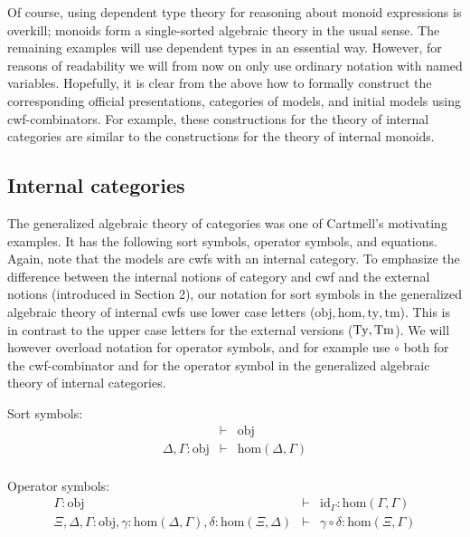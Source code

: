 \documentclass{mscs}
\newcommand{\FYI}[1]{{#1}}
\def\Obj{\mathrm{obj}}
\def\Hom{\mathrm{hom}}
\def\id{\mathrm{id}}
\newcommand{\ty}{\mathrm{ty}}
\newcommand{\tm}{\mathrm{tm}}
\begin{document}
Of course, using dependent type theory for reasoning about monoid expressions is overkill; monoids form a single-sorted algebraic theory in the usual sense.
The remaining examples will use dependent types in an essential way. However, for reasons of readability we will from now on only use ordinary notation with named variables. Hopefully, it is clear from the above how to formally construct the corresponding official \FYI{presentations}, categories of models, and initial models using cwf-combinators. For example, these constructions for the theory of internal categories are similar to the constructions for the theory of internal monoids.


\subsection{Internal categories} The generalized algebraic theory of categories was one of Cartmell's motivating examples. It has the following sort symbols, operator symbols, and equations. Again, note that the models are cwfs with an internal category. To emphasize the difference between the internal notions of category and cwf and the external notions (introduced in Section 2), our notation for sort symbols in the generalized algebraic theory of internal cwfs use lower case letters ($\Obj, \Hom, \ty, \tm$). This is in contrast to the upper case letters for the external versions ($\mathrm{Ty}, \mathrm{Tm}$). We will however overload notation for operator symbols, and for example use $\circ$ both for the cwf-combinator and for the operator symbol in the generalized algebraic theory of internal categories.

Sort symbols:
\begin{eqnarray*}
&\vdash& \Obj\\
\Delta, \Gamma : \Obj &\vdash& \Hom(\Delta,\Gamma)\\
\end{eqnarray*}

Operator symbols:
\begin{eqnarray*}
\Gamma : \Obj &\vdash& \id_\Gamma : \Hom(\Gamma,\Gamma)\\
\Xi,\Delta,\Gamma : \Obj, \gamma : \Hom(\Delta,\Gamma), \delta : \Hom(\Xi,\Delta) &\vdash&
\gamma \circ \delta : \Hom(\Xi,\Gamma)
\end{eqnarray*}
\end{document}
